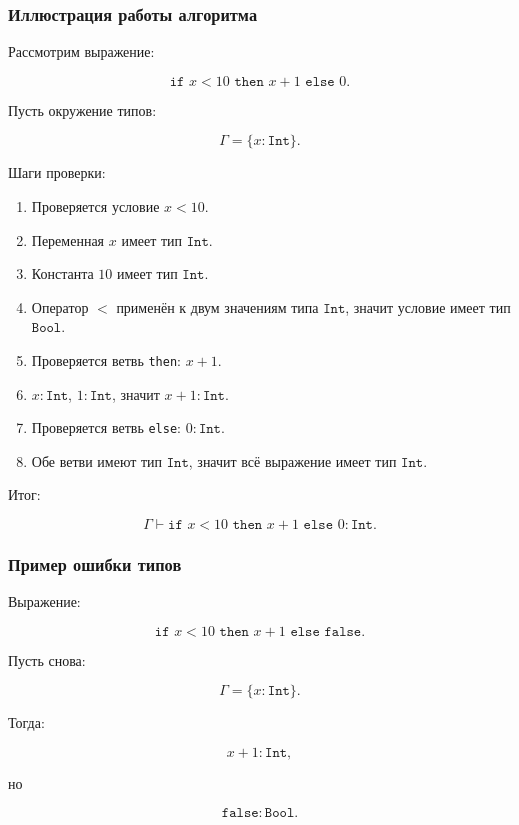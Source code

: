 \documentclass[12pt,a4paper]{article}
\begin{document}
\subsubsection{Иллюстрация работы алгоритма}

Рассмотрим выражение:

\[
\texttt{if } x < 10 \texttt{ then } x + 1 \texttt{ else } 0.
\]

Пусть окружение типов:

\[
\Gamma = \{x : \texttt{Int}\}.
\]

Шаги проверки:

\begin{enumerate}
    \item Проверяется условие \(x < 10\).
    \item Переменная \(x\) имеет тип \(\texttt{Int}\).
    \item Константа \(10\) имеет тип \(\texttt{Int}\).
    \item Оператор \(<\) применён к двум значениям типа \(\texttt{Int}\), значит
    условие имеет тип \(\texttt{Bool}\).
    \item Проверяется ветвь \texttt{then}: \(x + 1\).
    \item \(x : \texttt{Int}\), \(1 : \texttt{Int}\), значит \(x + 1 : \texttt{Int}\).
    \item Проверяется ветвь \texttt{else}: \(0 : \texttt{Int}\).
    \item Обе ветви имеют тип \(\texttt{Int}\), значит всё выражение имеет тип
    \(\texttt{Int}\).
\end{enumerate}

Итог:

\[
\Gamma \vdash
\texttt{if } x < 10 \texttt{ then } x + 1 \texttt{ else } 0
:
\texttt{Int}.
\]

\subsubsection{Пример ошибки типов}

Выражение:

\[
\texttt{if } x < 10 \texttt{ then } x + 1 \texttt{ else } \texttt{false}.
\]

Пусть снова:

\[
\Gamma = \{x : \texttt{Int}\}.
\]

Тогда:

\[
x + 1 : \texttt{Int},
\]

но

\[
\texttt{false} : \texttt{Bool}.
\]
\end{document}
